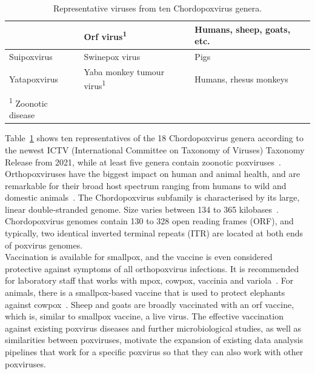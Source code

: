 \begin{table}[ht!]
\begin{tabular}{lll}
						& Orf virus\textsuperscript{1}                    & Humans, sheep, goats, etc.                  \\ \hline
	Suipoxvirus         & Swinepox virus                                  & Pigs                                        \\ \hline
	Yatapoxvirus        & Yaba monkey tumour virus\textsuperscript{1}     & Humans, rhesus monkeys                      \\ \hline
	\textsuperscript{1} Zoonotic disease &                                &                                             \\
	\end{tabular}
	\caption{Representative viruses from ten Chordopoxvirus genera.}
	\label{tab:2-chordopox}
\end{table}

Table~\ref{tab:2-chordopox} shows ten representatives of the 18 Chordopoxvirus genera according to the newest ICTV (International Committee on Taxonomy of Viruses) Taxonomy Release from 2021, while at least five genera contain zoonotic poxviruses~\cite{tax2021pox}. Orthopoxviruses have the biggest impact on human and animal health, and are remarkable for their broad host spectrum ranging from humans to wild and domestic animals~\cite{fenner2000adventures}.
The Chordopoxvirus subfamily is characterised by its large, linear double-stranded genome. Size varies between 134 to 365 kilobases~\cite{brunetti2003complete, tulman2004genome}. Chordopoxvirus genomes contain 130 to 328 open reading frames (ORF), and typically, two identical inverted terminal repeats (ITR) are located at both ends of poxvirus genomes. \\
Vaccination is available for smallpox, and the vaccine is even considered protective against symptoms of all orthopoxvirus infections. It is recommended for laboratory staff that works with mpox, cowpox, vaccinia and variola~\cite{cono2003smallpox}. For animals, there is a smallpox-based vaccine that is used to protect elephants against cowpox~\cite{kurth2008rat}. Sheep and goats are broadly vaccinated with an orf vaccine, which is, similar to smallpox vaccine, a live virus. The effective vaccination against existing poxvirus diseases and further microbiological studies, as well as similarities between poxviruses, motivate the expansion of existing data analysis pipelines that work for a specific poxvirus so that they can also work with other poxviruses.

